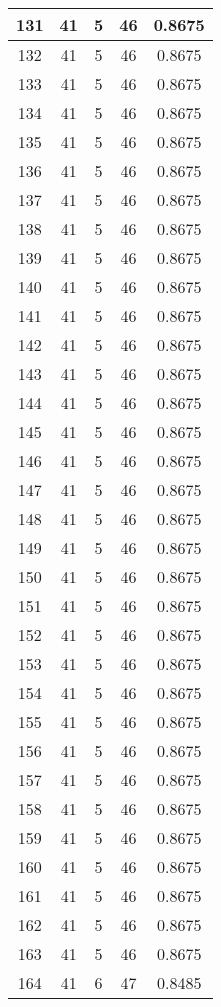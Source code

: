 \documentclass[letterpaper, 12pt]{article}
\begin{document}
\begin{longtable}{|c|c|c|c|c|}
\hline
131 & 41 & 5 & 46 & 0.8675 \\
\hline
132 & 41 & 5 & 46 & 0.8675 \\
\hline
133 & 41 & 5 & 46 & 0.8675 \\
\hline
134 & 41 & 5 & 46 & 0.8675 \\
\hline
135 & 41 & 5 & 46 & 0.8675 \\
\hline
136 & 41 & 5 & 46 & 0.8675 \\
\hline
137 & 41 & 5 & 46 & 0.8675 \\
\hline
138 & 41 & 5 & 46 & 0.8675 \\
\hline
139 & 41 & 5 & 46 & 0.8675 \\
\hline
140 & 41 & 5 & 46 & 0.8675 \\
\hline
141 & 41 & 5 & 46 & 0.8675 \\
\hline
142 & 41 & 5 & 46 & 0.8675 \\
\hline
143 & 41 & 5 & 46 & 0.8675 \\
\hline
144 & 41 & 5 & 46 & 0.8675 \\
\hline
145 & 41 & 5 & 46 & 0.8675 \\
\hline
146 & 41 & 5 & 46 & 0.8675 \\
\hline
147 & 41 & 5 & 46 & 0.8675 \\
\hline
148 & 41 & 5 & 46 & 0.8675 \\
\hline
149 & 41 & 5 & 46 & 0.8675 \\
\hline
150 & 41 & 5 & 46 & 0.8675 \\
\hline
151 & 41 & 5 & 46 & 0.8675 \\
\hline
152 & 41 & 5 & 46 & 0.8675 \\
\hline
153 & 41 & 5 & 46 & 0.8675 \\
\hline
154 & 41 & 5 & 46 & 0.8675 \\
\hline
155 & 41 & 5 & 46 & 0.8675 \\
\hline
156 & 41 & 5 & 46 & 0.8675 \\
\hline
157 & 41 & 5 & 46 & 0.8675 \\
\hline
158 & 41 & 5 & 46 & 0.8675 \\
\hline
159 & 41 & 5 & 46 & 0.8675 \\
\hline
160 & 41 & 5 & 46 & 0.8675 \\
\hline
161 & 41 & 5 & 46 & 0.8675 \\
\hline
162 & 41 & 5 & 46 & 0.8675 \\
\hline
163 & 41 & 5 & 46 & 0.8675 \\
\hline
164 & 41 & 6 & 47 & 0.8485 \\

\end{longtable}
\end{document}
